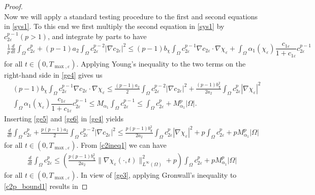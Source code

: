\documentclass[a4paper,10pt]{article}
\theoremstyle{definition}
\begin{document}
\begin{proof}
\begin{equation}
  \end{equation}
 Now we will apply a standard testing procedure to the first and second equations in \eqref{sys1}. To this end we  first multiply the second equation in \eqref{sys1} by $c_{2 \varepsilon}^{p - 1} (p > 1)$, and integrate by parts to have
\begin{align}
\label{ge4}
   \frac{1}{p} \frac{d}{dt} \int_\Omega c_{2\varepsilon}^p + (p - 1) a_2  \int_\Omega c_{2\varepsilon}^{p - 2}|\nabla c_{2\varepsilon}|^2 \leq (p - 1) b_\chi \int_\Omega c_{2\varepsilon}^{p - 1} \nabla c_{2\varepsilon} \cdot \nabla \chi_\varepsilon + \int_\Omega \alpha_1(\chi_\varepsilon) \dfrac{c_{1\varepsilon} }{1 + c_{1\varepsilon}} c_{2\varepsilon}^{p - 1}
\end{align}
for all $t \in (0, T_{\max, \varepsilon})$. Applying Young's inequality to the two terms on the right-hand side in \eqref{ge4} gives us
\begin{align}
  \label{ge5}
   & (p - 1) b_\chi \int_\Omega c_{2\varepsilon}^{p - 1} \nabla c_{2\varepsilon} \cdot \nabla \chi_\varepsilon \leq \frac{(p - 1) a_2}{2}\int_\Omega c_{2\varepsilon}^{p - 2} |\nabla c_{2 \varepsilon}|^2 + \frac{(p - 1) b_\chi^2}{2 a_2} \int_\Omega c_{2\varepsilon}^p |\nabla \chi_\varepsilon|^2  \\[5pt]
  \label{ge6}
  & \int_\Omega \alpha_1(\chi_\varepsilon) \dfrac{c_{1\varepsilon} }{1 + c_{1\varepsilon}} c_{2\varepsilon}^{p - 1}  \leq M_{\alpha_1} \int_\Omega c_{2\varepsilon}^{p - 1} \leq \int_\Omega c_{2\varepsilon}^p + M_{\alpha_1}^p |\Omega|.
\end{align}
Inserting \eqref{ge5} and \eqref{ge6} in \eqref{ge4} yields
\begin{align}
\label{c2ineq1}
\frac{d}{dt} \int_\Omega c_{2\varepsilon}^p + \frac{p(p - 1) a_2}{2}\int_\Omega c_{2\varepsilon}^{p - 2} |\nabla c_{2 \varepsilon}|^2\leq \frac{p (p - 1) b_\chi^2 }{2 a_2} \int_\Omega c_{2\varepsilon}^p |\nabla \chi_\varepsilon|^2 + p \int_\Omega c_{2\varepsilon}^p + p M_{\alpha_1}^p|\Omega|
\end{align}
for all $t \in (0, T_{\max, \varepsilon})$. From \eqref{c2ineq1} we can have
\begin{align}
  \label{c2p_bound1}
  \frac{d}{dt} \int_\Omega c_{2\varepsilon}^p \leq \left(\frac{p (p - 1) b_\chi^2 }{2 a_2} \|\nabla \chi_\varepsilon(\cdot, t)\|^2_{L^\infty(\Omega)} + p \right)\int_\Omega c_{2\varepsilon}^p + p M_{\alpha_1}^p|\Omega|
\end{align}
for all $t \in (0, T_{\max, \varepsilon})$. In view of \eqref{ge3}, applying Gronwall's inequality to \eqref{c2p_bound1} results in

\end{proof}
\end{document}
